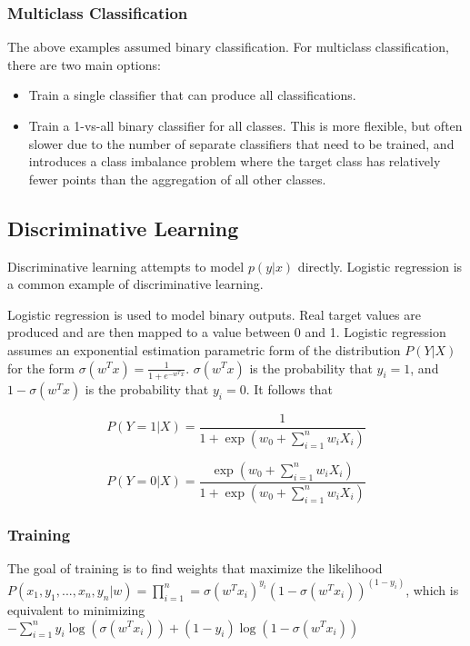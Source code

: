 \documentclass[12pt,titlepage]{article}
\begin{document}
      \subsubsection{Multiclass Classification}
        The above examples assumed binary classification. For multiclass classification, there are two main options:
        \begin{itemize}
          \item Train a single classifier that can produce all classifications.
          \item Train a 1-vs-all binary classifier for all classes. This is more flexible, but often slower due to the number of separate classifiers
            that need to be trained, and introduces a class imbalance problem where the target class has relatively fewer points than the aggregation of
            all other classes.
        \end{itemize}

    \subsection{Discriminative Learning}
      Discriminative learning attempts to model $p(y|x)$ directly. Logistic regression is a common example of discriminative learning.

      Logistic regression is used to model binary outputs. Real target values are produced and are then mapped to a value between 0 and 1. Logistic
      regression assumes an exponential estimation parametric form of the distribution $P(Y|X)$ for the form $\sigma(w^Tx) = \frac{1}{1 + e^{-w^Tx}}$.
      $\sigma(w^Tx)$ is the probability that $y_i = 1$, and $1 - \sigma(w^Tx)$ is the probability that $y_i = 0$. It follows that

      $$P(Y=1|X) = \frac{1}{1 + \exp{(w_0 + \sum_{i=1}^n w_i X_i)}}$$

      $$P(Y=0|X) = \frac{\exp{(w_0 + \sum_{i=1}^n w_i X_i)}}{1 + \exp{(w_0 + \sum_{i=1}^n w_i X_i)}}$$

      \subsubsection{Training}
        The goal of training is to find weights that maximize the likelihood $P(x_1, y_1, . . ., x_n, y_n|w) = \prod_{i=1}^n = \sigma(w^Tx_i)^{y_i}(1 - \sigma(w^Tx_i))^{(1 - y_i)}$,
        which is equivalent to minimizing $-\sum_{i=1}^n y_i \log{(\sigma(w^Tx_i))} + (1 - y_i) \log{(1 - \sigma(w^Tx_i))}$
\end{document}

